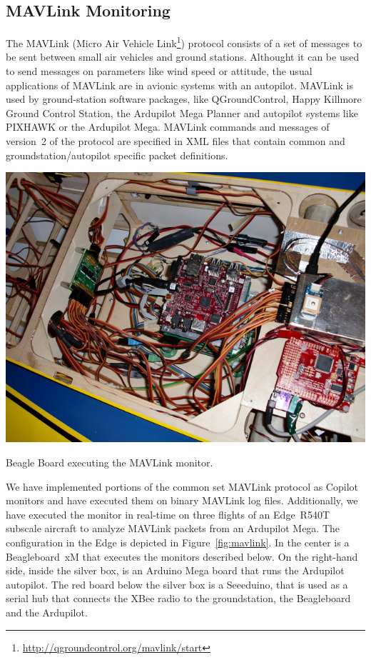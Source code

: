 \subsection{MAVLink Monitoring}

The MAVLink (Micro Air Vehicle
Link\footnote{\url{http://qgroundcontrol.org/mavlink/start}}) protocol consists
of a set of messages to be sent between small air vehicles and ground
stations. Althought it can be used to send messages on parameters like wind
speed or attitude, the usual applications of MAVLink are in avionic systems with
an autopilot. MAVLink is used by ground-station software packages, like
QGroundControl, Happy Killmore Ground Control Station, the Ardupilot Mega
Planner and autopilot systems like PIXHAWK or the Ardupilot Mega. MAVLink
commands and messages of version~2 of the protocol are specified in XML files
that contain common and groundstation/autopilot specific packet definitions.

\begin{myfig}[ht!]
\includegraphics[scale=0.5]{Figs/inside_R3}
\caption{Beagle Board executing the MAVLink monitor.} \label{fig:mavlink}
\end{myfig}

We have implemented portions of the common set MAVLink protocol as Copilot
monitors and have executed them on binary MAVLink log files.  Additionally, we
have executed the monitor in real-time on three flights of an Edge~R540T
subscale aircraft to analyze MAVLink packets from an Ardupilot Mega.  The
configuration in the Edge is depicted in Figure~\ref{fig:mavlink}.  In the
center is a Beagleboard~xM that executes the monitors described below.  On the
right-hand side, inside the silver box, is an Arduino Mega board that runs the
Ardupilot autopilot.  The red board below the silver box is a Seeeduino, that is
used as a serial hub that connects the XBee radio to the groundstation, the
Beagleboard and the Ardupilot.

